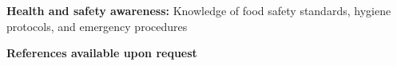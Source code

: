 	\vspace{0.2 cm}
	
	\begin{onecolentry}
		\textbf{Health and safety awareness:} Knowledge of food safety standards, hygiene protocols, and emergency procedures
	\end{onecolentry}
	
	\vspace{0.2 cm}
	
	\begin{onecolentry}
		\begin{center}
			\textbf{References available upon request}
		\end{center}
	\end{onecolentry}
	
	
